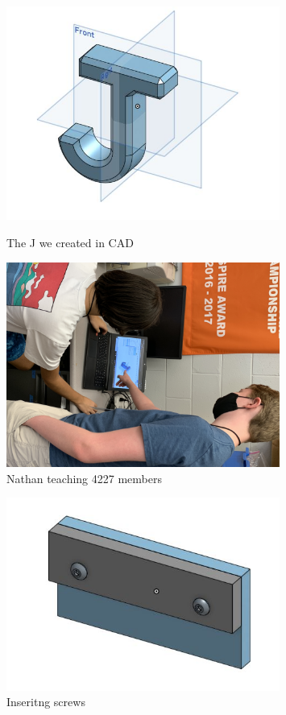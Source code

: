 \begin{figure}[ht]
\centering
\begin{minipage}[b]{.50\textwidth}
  \centering
  \includegraphics[width=0.8\textwidth]{Meetings/September/09-01-21/9-1-21_Program_Image1 - Nathan Forrer.JPG}
  \caption{The J we created in CAD}
  \label{fig:090121_1}
\end{minipage}%
\hfill%
\begin{minipage}[b]{.50\textwidth}
  \centering
  \includegraphics[width=0.8\textwidth]{Meetings/September/09-01-21/9-1-21_Program_Image2 - Nathan Forrer.JPG}
  \caption{Nathan teaching 4227 members}
  \label{fig:090121_2}
\end{minipage}
\end{figure}

\begin{figure}[htp]
\centering
\includegraphics[width=0.8\textwidth]{Meetings/September/09-01-21/9-1-21_Program_Image3 - Nathan Forrer.JPG}
\caption{Inseritng screws}
\label{fig:090121_3}
\end{figure}


